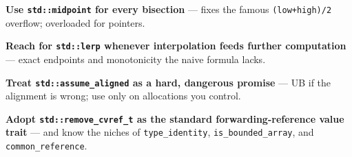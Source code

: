 \textbf{Use \texttt{std::midpoint} for every bisection} --- fixes the famous \texttt{(low+high)/2} overflow; overloaded for pointers.

\textbf{Reach for \texttt{std::lerp} whenever interpolation feeds further computation} --- exact endpoints and monotonicity the naive formula lacks.

\textbf{Treat \texttt{std::assume\_aligned} as a hard, dangerous promise} --- UB if the alignment is wrong; use only on allocations you control.

\textbf{Adopt \texttt{std::remove\_cvref\_t} as the standard forwarding-reference value trait} --- and know the niches of \texttt{type\_identity}, \texttt{is\_bounded\_array}, and \texttt{common\_reference}.
